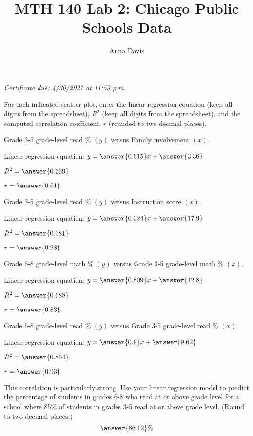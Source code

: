 \documentclass{ximera}
\author{Anna Davis} \title{MTH 140 Lab 2: Chicago Public Schools Data}
\begin{document}
\begin{abstract}

\end{abstract}
\maketitle
 \textit{Certificate due: 4/30/2021 at 11:59 p.m.}
 
For each indicated scatter plot, enter the linear regression equation (keep all digits from the spreadsheet), $R^2$ (keep all digits from the spreadsheet), and the computed correlation coefficient, $r$ (rounded to two decimal places).

\begin{problem}\label{prob:140lab4prob1}
Grade 3-5 grade-level read \% $(y)$ versus Family involvement $(x)$.

Linear regression equation: $y=\answer{0.615}x+\answer{3.36}$

$R^2=\answer{0.369}$

$r=\answer{0.61}$
\end{problem}

\begin{problem}\label{prob:140lab4prob2}
Grade 3-5 grade-level read \% $(y)$ versus Instruction score $(x)$.

Linear regression equation: $y=\answer{0.324}x+\answer{17.9}$

$R^2=\answer{0.081}$

$r=\answer{0.28}$
\end{problem}

\begin{problem}\label{prob:140lab4prob3}
Grade 6-8 grade-level math \% $(y)$ versus Grade 3-5 grade-level math \% $(x)$.

Linear regression equation: $y=\answer{0.809}x+\answer{12.8}$

$R^2=\answer{0.688}$

$r=\answer{0.83}$
\end{problem}

\begin{problem}\label{prob:140lab4prob4}
Grade 6-8 grade-level read \% $(y)$ versus Grade 3-5 grade-level read \% $(x)$.

Linear regression equation: $y=\answer{0.9}x+\answer{9.62}$

$R^2=\answer{0.864}$

$r=\answer{0.93}$

This correlation is particularly strong.  Use your linear regression model to predict the percentage of students in grades 6-8 who read at or above grade level for a school where 85\% of students in grades 3-5 read at or above grade level.  (Round to two decimal places.)
$$\answer{86.12}\%$$
\end{problem}
\end{document}
